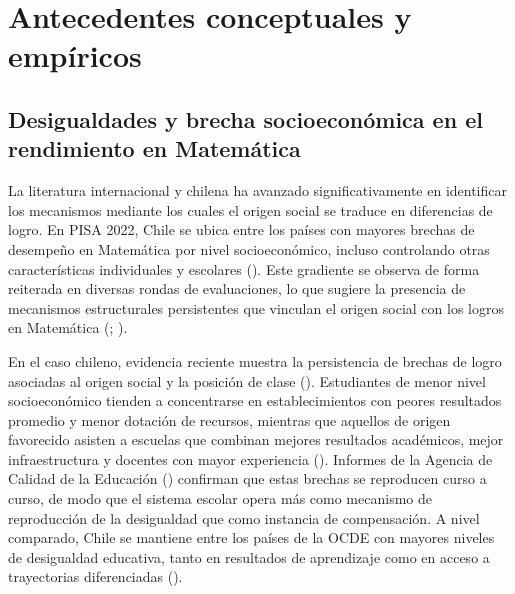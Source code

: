 \documentclass[
  spanish,
  a4paper,
  oneside]{scrbook}
\begin{document}

\chapter{Antecedentes conceptuales y
empíricos}\label{antecedentes-conceptuales-y-empuxedricos}

\section{Desigualdades y brecha socioeconómica en el rendimiento en
Matemática}\label{desigualdades-y-brecha-socioeconuxf3mica-en-el-rendimiento-en-matemuxe1tica}

La literatura internacional y chilena ha avanzado significativamente en
identificar los mecanismos mediante los cuales el origen social se
traduce en diferencias de logro. En PISA 2022, Chile se ubica entre los
países con mayores brechas de desempeño en Matemática por nivel
socioeconómico, incluso controlando otras características individuales y
escolares
(). Este gradiente se observa de forma reiterada en diversas
rondas de evaluaciones, lo que sugiere la presencia de mecanismos
estructurales persistentes que vinculan el origen social con los logros
en Matemática
(;
).

En el caso chileno, evidencia reciente muestra la persistencia de
brechas de logro asociadas al origen social y la posición de clase
(). Estudiantes de menor nivel socioeconómico tienden a concentrarse
en establecimientos con peores resultados promedio y menor dotación de
recursos, mientras que aquellos de origen favorecido asisten a escuelas
que combinan mejores resultados académicos, mejor infraestructura y
docentes con mayor experiencia (). Informes de la Agencia de Calidad de la Educación
() confirman que estas brechas se
reproducen curso a curso, de modo que el sistema escolar opera más como
mecanismo de reproducción de la desigualdad que como instancia de
compensación. A nivel comparado, Chile se mantiene entre los países de
la OCDE con mayores niveles de desigualdad educativa, tanto en
resultados de aprendizaje como en acceso a trayectorias diferenciadas
().
\end{document}
